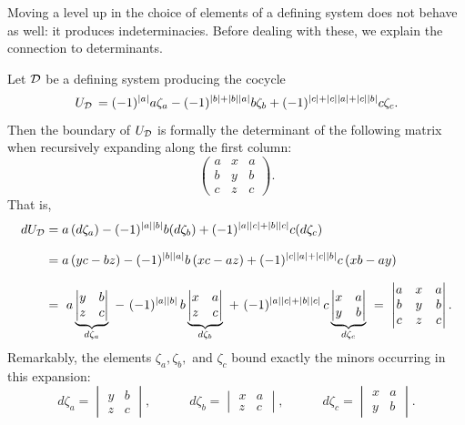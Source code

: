 \documentclass[11pt]{article}
\theoremstyle{definition}
\theoremstyle{definition}
\begin{document}
Moving a level up in the choice of elements of a defining system does not behave as well: 
it produces indeterminacies.
Before dealing with these, we explain the connection to determinants.

\smallskip

Let $\mathcal D$ be a defining system producing the cocycle 
$$U_{\mathcal D} \,=(-1)^{|a|}a\zeta_a - (-1)^{|b| + |b||a|}b \zeta_b + (-1)^{|c|+ |c||a| + |c||b| }c\zeta_c.$$
Then the boundary of $U_\mathcal D$
is formally the determinant of the following matrix when recursively expanding along the first column: 
$$ \begin{pmatrix}
a & x & a \\
b & y & b \\
c & z & c 
\end{pmatrix}.$$
That is, 
\begin{align*}
dU_{\mD} &=a\left(d\zeta_a\right) - (-1)^{|a||b|}b(d\zeta_b) + (-1)^{|a||c|+|b||c|}c(d\zeta_c)  \\[0.25cm]  
&= a\left(yc-bz\right) -(-1)^{|b||a|}b\left(xc-az\right)
+(-1)^{|c||a|+|c||b|}c\left(xb-ay\right)\\[0.25cm] 
&= \ 
a\underbrace{\begin{vmatrix}
y & b \\
z & c 
\end{vmatrix}}_{d\zeta_a}
\ -\ (-1)^{|a||b|}\, b\underbrace{\begin{vmatrix}
x & a \\
z & c 
\end{vmatrix}}_{d\zeta_b}
\ +\ (-1)^{|a||c|+|b||c|}\, c \underbrace{\begin{vmatrix}
x & a \\
y & b 
\end{vmatrix}}_{d\zeta_c} 
\ =\ \begin{vmatrix}
a & x & a \\
b & y & b \\
c & z & c 
\end{vmatrix}.
\end{align*}
Remarkably, the elements $\zeta_a,\zeta_b,$ and $\zeta_c$ bound
exactly the minors occurring in this expansion:
\begin{equation*}
d\zeta_a = \begin{vmatrix}
y & b \\
z & c 
\end{vmatrix}, \qquad \quad 
d\zeta_b = 
\begin{vmatrix}
x & a \\
z & c 
\end{vmatrix}, \qquad \quad 
d\zeta_c =\begin{vmatrix}
x & a \\
y & b 
\end{vmatrix}.
\end{equation*}
\end{document}
